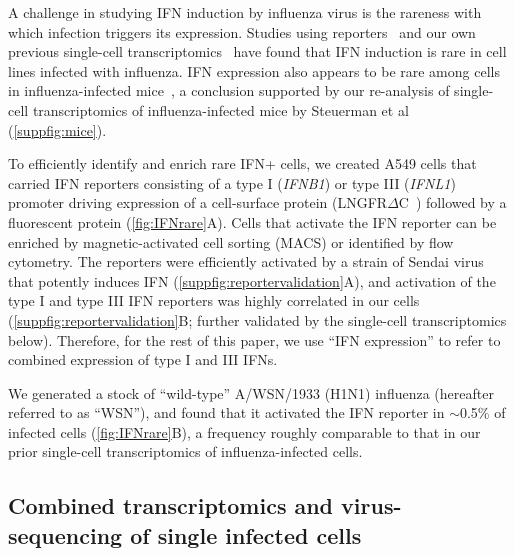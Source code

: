 \documentclass[10pt,letterpaper]{article}
\newcommand{\FIG}[1]{\autoref{fig:#1}}
\newcommand{\SUPPFIG}[1]{\autoref{suppfig:#1}}
\begin{document}
A challenge in studying IFN induction by influenza virus is the rareness with which infection triggers its expression.
Studies using reporters~\cite{killip2017single} and our own previous single-cell transcriptomics~\cite{russell2018extreme} have found that IFN induction is rare in cell lines infected with influenza.
IFN expression also appears to be rare among cells in influenza-infected mice~\cite{kallfass2013visualizing}, a conclusion supported by our re-analysis of single-cell transcriptomics of influenza-infected mice by Steuerman et al~\cite{steuerman2018dissection} (\SUPPFIG{mice}).

To efficiently identify and enrich rare IFN+ cells, we created A549 cells that carried IFN reporters consisting of a type I (\textit{IFNB1}) or type III (\textit{IFNL1}) promoter driving expression of a cell-surface protein (LNGFR$\Delta$C~\cite{bonini1997hsv,ruggieri1997cell}) followed by a fluorescent protein (\FIG{IFNrare}A).
Cells that activate the IFN reporter can be enriched by magnetic-activated cell sorting (MACS) or identified by flow cytometry.
The reporters were efficiently activated by a strain of Sendai virus~\cite{strahle2006sendai} that potently induces IFN (\SUPPFIG{reportervalidation}A), and activation of the type I and type III IFN reporters was highly correlated in our cells (\SUPPFIG{reportervalidation}B; further validated by the single-cell transcriptomics below).
Therefore, for the rest of this paper, we use ``IFN expression'' to refer to combined expression of type I and III IFNs. 

We generated a stock of ``wild-type'' A/WSN/1933 (H1N1) influenza (hereafter referred to as ``WSN''), and found that it activated the IFN reporter in $\sim$0.5\% of infected cells  (\FIG{IFNrare}B), a frequency roughly comparable to that in our prior single-cell transcriptomics of influenza-infected cells.

\subsection*{Combined transcriptomics and virus-sequencing of single infected cells}
\end{document}
